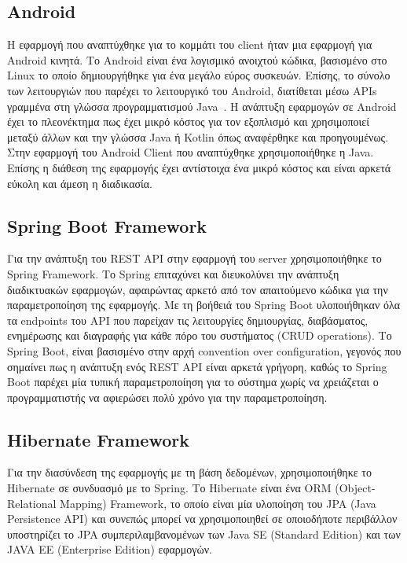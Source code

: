 \documentclass[oneside, 12pt]{book}
\begin{document}
\subsection{Android} Η εφαρμογή που αναπτύχθηκε για το κομμάτι του 
client ήταν μια εφαρμογή για Android κινητά. Το Android είναι ένα 
λογισμικό  ανοιχτού κώδικα, βασισμένο στο Linux το οποίο 
δημιουργήθηκε για ένα μεγάλο εύρος συσκευών. Επίσης, το σύνολο των 
λειτουργιών που παρέχει το λειτουργικό του Android, διατίθεται μέσω 
APIs γραμμένα στη γλώσσα προγραμματισμού Java~\cite{android_platform}.
Η ανάπτυξη εφαρμογών σε Android έχει το πλεονέκτημα πως έχει μικρό 
κόστος για τον εξοπλισμό και χρησιμοποιεί μεταξύ άλλων και την γλώσσα 
Java ή Kotlin όπως αναφέρθηκε και προηγουμένως. 
Στην εφαρμογή του Android Client που αναπτύχθηκε χρησιμοποιήθηκε η 
Java. Επίσης η διάθεση της εφαρμογής έχει αντίστοιχα ένα μικρό κόστος 
και είναι αρκετά εύκολη και άμεση η διαδικασία.

\subsection{Spring Boot Framework} Για την ανάπτυξη του REST API στην 
εφαρμογή του server χρησιμοποιήθηκε το Spring Framework.
Το Spring επιταχύνει και διευκολύνει την ανάπτυξη διαδικτυακών 
εφαρμογών, αφαιρώντας αρκετό από τον απαιτούμενο κώδικα για την 
παραμετροποίηση της εφαρμογής.
Με τη βοήθειά του Spring Boot υλοποιήθηκαν όλα τα endpoints του API που παρείχαν τις λειτουργίες δημιουργίας, 
διαβάσματος, ενημέρωσης και διαγραφής για κάθε πόρο του συστήματος 
(CRUD operations). Το Spring Boot, είναι βασισμένο στην αρχή 
convention over configuration, γεγονός που σημαίνει πως η ανάπτυξη 
ενός REST API είναι αρκετά γρήγορη, καθώς το Spring Boot παρέχει μία 
τυπική παραμετροποίηση για το σύστημα χωρίς να χρειάζεται ο 
προγραμματιστής να αφιερώσει πολύ χρόνο για την παραμετροποίηση.

\subsection{Hibernate Framework}
Για την διασύνδεση της εφαρμογής με τη βάση δεδομένων, χρησιμοποιήθηκε 
το Hibernate σε συνδυασμό με το Spring. Το Hibernate είναι ένα ORM 
(Object-Relational Mapping) Framework, το οποίο είναι μία υλοποίηση 
του  JPA (Java Persistence API) και συνεπώς μπορεί να χρησιμοποιηθεί 
σε οποιοδήποτε περιβάλλον υποστηρίζει το JPA συμπεριλαμβανομένων των 
Java SE (Standard Edition) και των JAVA EE (Enterprise Edition) 
εφαρμογών.
\cite{hibernate_orm}
\end{document}
